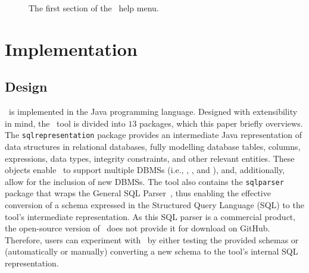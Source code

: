 \begin{figure}

\caption{\label{fig:usage} The first section of the \sa~help menu.}
\vspace*{-.1in}
\end{figure}

\section{Implementation}\label{sec:implementation}
\subsection{Design}


\sa~is implemented in the Java programming language.  Designed with extensibility in mind, the \sa~tool is divided into
$13$ packages, which this paper briefly overviews. The \texttt{sqlrepresentation} package provides an intermediate Java
representation of data structures in relational databases, fully modelling database tables, columns, expressions, data
types, integrity constraints, and other relevant entities. These objects enable \sa~to support multiple DBMSs (i.e.,
\sqlite, \postgres, and \hypersql), and, additionally, allow for the inclusion of new DBMSs. The tool also contains the
\texttt{sqlparser} package that wraps the General SQL Parser~\cite{generalsqlparser}, thus enabling the effective
conversion of a schema expressed in the Structured Query Language (SQL) to the tool's intermediate representation. As
this SQL parser is a commercial product, the open-source version of \sa~does not provide it for download on GitHub.
Therefore, users can experiment with \sa~by either testing the provided schemas or (automatically or manually)
converting a new schema to the tool's internal SQL representation.



